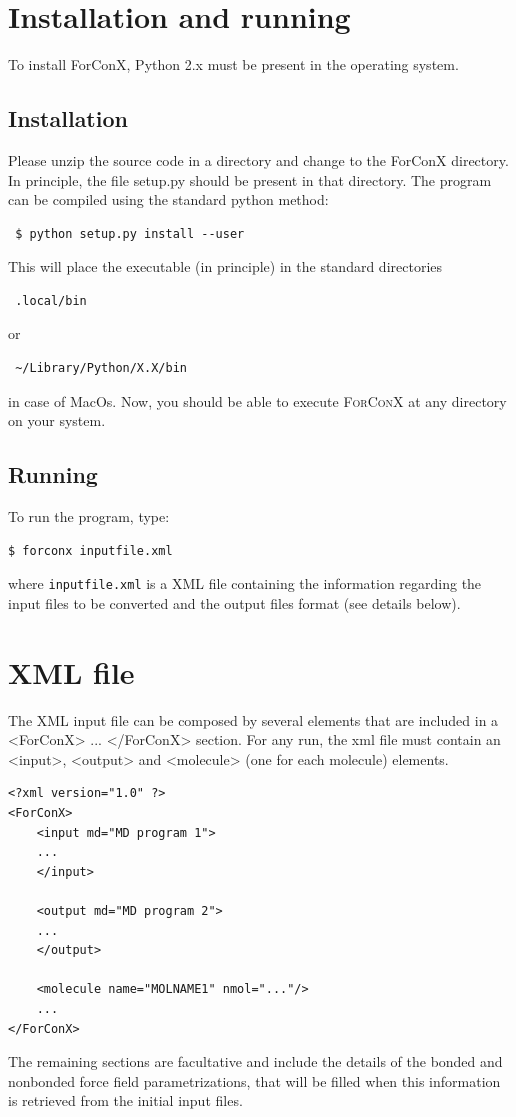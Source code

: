 \documentclass[12pt]{article}
\begin{document}
\section{Installation and running}
To install ForConX, Python 2.x must be present in the operating system. 

\subsection{Installation}
Please unzip the source code in a directory and change to the ForConX directory. In principle, the file setup.py should be present in that directory.
The program can be compiled using the standard python method:

\begin{lstlisting}
 $ python setup.py install --user
\end{lstlisting}
This will place the executable (in principle) in the standard directories
\begin{lstlisting}
 .local/bin
\end{lstlisting}
or 
\begin{lstlisting}
 ~/Library/Python/X.X/bin
\end{lstlisting}
in case of MacOs.
Now, you should be able to execute \textsc{ForConX} at any directory on your system.


\subsection{Running}

To run the program, type:
\begin{lstlisting}
$ forconx inputfile.xml
\end{lstlisting}
where \texttt{inputfile.xml} is a XML file containing the information 
regarding the input files to be converted and the output files format (see details below).


\section{XML file}
The XML input file can be composed by several elements that are included in a <ForConX> ... </ForConX> section.  
For any run, the xml file must contain an <input>, <output> and <molecule> (one for each molecule) elements.  
\begin{lstlisting}[basicstyle=\linespread{1.1}\ttfamily]
<?xml version="1.0" ?>
<ForConX>
    <input md="MD program 1">
    ...
    </input>

    <output md="MD program 2">
    ...
    </output>

    <molecule name="MOLNAME1" nmol="..."/>
    ...
</ForConX>
\end{lstlisting}
The remaining sections are facultative and include the details of the bonded and nonbonded force field parametrizations, 
that will be filled when this information is retrieved from the initial input files.
\end{document}

